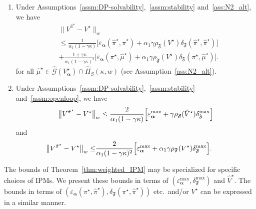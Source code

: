 \documentclass[letterpaper, 10pt]{IEEEtran}
\newcommand*\ALPHABET{\mathcal}
\newcommand*\tuple{\kappa, w}
\newcommand\F{\mathfrak{F}}
\begin{document}
\begin{theorem}
\begin{enumerate}
        \item Under Assumptions~\ref{assm:DP-solvability},~\ref{assm:stability} and~\ref{ass:N2_alt}, we have
            \begin{align*}
            &
            \bigl\| V^{\hat \pi^\star} - V^\star \bigr\|_w \\
            & \leq
            \frac{1}{\alpha_1(1-\gamma\kappa)}\bigl[\varepsilon_{\boldsymbol{\alpha}}(\hat\pi^\star,\hat\pi^\star) 
             +\alpha_1\gamma\rho_{\mathfrak F}(V^\star)\delta_{\mathfrak F}(\hat\pi^\star,\hat\pi^\star)\bigr] \\
            & + \frac{1+\gamma\kappa}{\alpha_1(1-\gamma\kappa)^2}\bigl[\varepsilon_{\boldsymbol{\alpha}}(\pi^\star,\hat\mu^\star) 
             + \alpha_1\gamma\rho_{\mathfrak F}(V^\star)\delta_{\mathfrak F}(\pi^\star,\hat\mu^\star)\bigr].
        \end{align*}
        for all $\hat\mu^\star \in \hat {\ALPHABET G}(V^\star_{\boldsymbol{\alpha}}) \cap  \hat \Pi_S(\tuple)$ (see Assumption~\ref{ass:N2_alt}).
        \item Under Assumptions~\ref{assm:DP-solvability},~\ref{assm:stability} and~\ref{assm:openloop}, we have
        \[
            \bigl\| V^{\hat \pi^\star} - V^\star \bigr\|_w \leq \frac{2}{\alpha_1(1-\gamma\kappa)}
            \Bigl[ \varepsilon_{\boldsymbol{\alpha}}^{\max} + \gamma \rho_{\F}(\hat V^\star) \delta_{\F}^{\max} \Bigr]
        \]      
        and 
        \begin{align*}
            \hskip -1em \bigl\| V^{\hat \pi^\star} - V^\star \bigr\|_w \leq&
            \frac{2} {\alpha_1(1-\gamma\kappa)^2} \Bigl[ \varepsilon_{\boldsymbol{\alpha}}^{\max} + \alpha_1\gamma \rho_{\F}(V^\star) \delta_{\F}^{\max} \Bigr]. 
        \end{align*}
        
    \end{enumerate}
\end{theorem}

The bounds of Theorem~\ref{thm:weighted_IPM} may be specialized for specific choices of IPMs. We present these bounds in terms of $(\varepsilon_{\boldsymbol{\alpha}}^{\max}, \delta_{\F}^{\max})$ and $\hat V^\star$. The bounds in terms of 
$(\varepsilon_{\boldsymbol{\alpha}}(\pi^\star,\hat\pi^\star), \delta_{\mathfrak F}(\pi^\star,\hat\pi^\star))$ etc.\ and/or $V^{\star}$ can be expressed in a similar manner.
\end{document}

